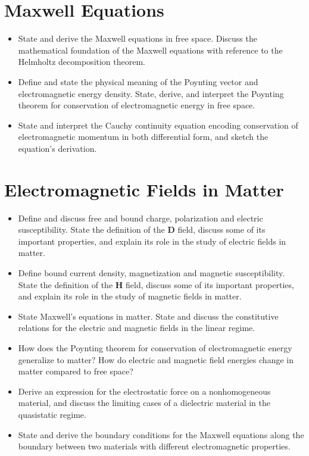 \section{Maxwell Equations}

\begin{itemize}

    \item State and derive the Maxwell equations in free space. Discuss the mathematical foundation of the Maxwell equations with reference to the Helmholtz decomposition theorem.

    \item Define and state the physical meaning of the Poynting vector and electromagnetic energy density.
    State, derive, and interpret the Poynting theorem for conservation of electromagnetic energy in free space.

    \item State and interpret the Cauchy continuity equation encoding conservation of electromagnetic momentum in both differential form, and sketch the equation's derivation.

\end{itemize}

\section{Electromagnetic Fields in Matter}

\begin{itemize}

    \item Define and discuss free and bound charge, polarization and electric susceptibility. State the definition of the $ \bm{D} $ field, discuss some of its important properties, and explain its role in the study of electric fields in matter.

    \item Define bound current density, magnetization and magnetic susceptibility. State the definition of the $ \bm{H} $ field, discuss some of its important properties, and explain its role in the study of magnetic fields in matter.

    \item State Maxwell's equations in matter. State and discuss the constitutive relations for the electric and magnetic fields in the linear regime.

    \item How does the Poynting theorem for conservation of electromagnetic energy generalize to matter? How do electric and magnetic field energies change in matter compared to free space?

    \item Derive an expression for the electrostatic force on a nonhomogeneous material, and discuss the limiting cases of a dielectric material in the quasistatic regime.

    \item State and derive the boundary conditions for the Maxwell equations along the boundary between two materials with different electromagnetic properties.

\end{itemize}


